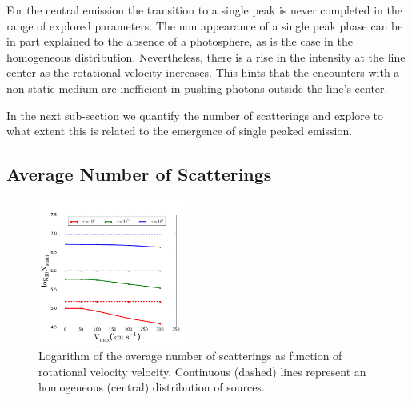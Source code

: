 \documentclass{emulateapj}
\begin{document}
For the central emission the transition to a single peak is never
completed in the range of explored parameters. The non appearance
of a single peak phase can be in part explained to the absence of a
photosphere, as is the case in the homogeneous
distribution. Nevertheless, there is a rise in the intensity at the
line center as the rotational velocity increases. This hints that the
encounters with a non static medium are inefficient in pushing photons
outside the line's center.

In the next sub-section we quantify the number of scatterings and explore
to what extent this is related to the emergence of single peaked emission. 

\subsection{Average Number of Scatterings}


\begin{figure}
    \includegraphics[width=0.45\textwidth]{NscattvsVmax.png}
\caption{Logarithm of the average number of scatterings as function of
  rotational velocity velocity. Continuous (dashed) lines represent an
  homogeneous (central) distribution of sources. \label{fig:Nscatt}}    
\end{figure}
\end{document}

